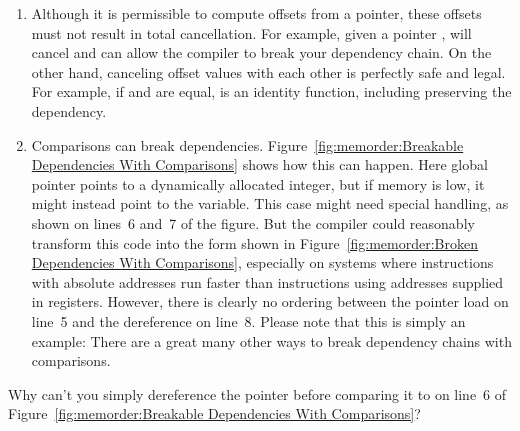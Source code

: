 \begin{enumerate}
\item	Although it is permissible to compute offsets from a
	pointer, these offsets must not result in total cancellation.
	For example, given a  pointer ,
	 will cancel and can allow the compiler
	to break your dependency chain.
	On the other hand, canceling offset values with each other
	is perfectly safe and legal.
	For example, if  and  are equal, 
	is an identity function, including preserving the dependency.
\item	Comparisons can break dependencies.
	Figure~\ref{fig:memorder:Breakable Dependencies With Comparisons}
	shows how this can happen.
	Here global pointer  points to a dynamically allocated
	integer, but if memory is low, it might instead point to
	the  variable.
	This  case might need special handling, as
	shown on lines~6 and~7 of the figure.
	But the compiler could reasonably transform this code into
	the form shown in
	Figure~\ref{fig:memorder:Broken Dependencies With Comparisons},
	especially on systems where instructions with absolute
	addresses run faster than instructions using addresses
	supplied in registers.
	However, there is clearly no ordering between the pointer
	load on line~5 and the dereference on line~8.
	Please note that this is simply an example: There are a great
	many other ways to break dependency chains with comparisons.
\end{enumerate}

\QuickQuiz{}
	Why can't you simply dereference the pointer before comparing it
	to  on line~6 of
	Figure~\ref{fig:memorder:Breakable Dependencies With Comparisons}?
 \QuickQuizEnd

